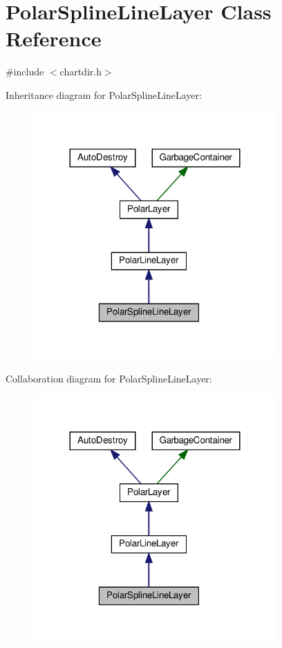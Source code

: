 \hypertarget{class_polar_spline_line_layer}{}\section{Polar\+Spline\+Line\+Layer Class Reference}
\label{class_polar_spline_line_layer}


{\ttfamily \#include $<$chartdir.\+h$>$}



Inheritance diagram for Polar\+Spline\+Line\+Layer\+:
\nopagebreak
\begin{figure}[H]
\begin{center}
\leavevmode
\includegraphics[width=264pt]{class_polar_spline_line_layer__inherit__graph}
\end{center}
\end{figure}


Collaboration diagram for Polar\+Spline\+Line\+Layer\+:
\nopagebreak
\begin{figure}[H]
\begin{center}
\leavevmode
\includegraphics[width=264pt]{class_polar_spline_line_layer__coll__graph}
\end{center}
\end{figure}
